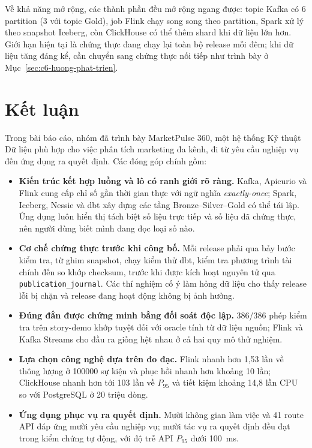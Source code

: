 Về khả năng mở rộng, các thành phần đều mở rộng ngang được: topic Kafka có 6 partition (3 với topic Gold), job Flink chạy song song theo partition, Spark xử lý theo snapshot Iceberg, còn ClickHouse có thể thêm shard khi dữ liệu lớn hơn. Giới hạn hiện tại là chứng thực đang chạy lại toàn bộ release mỗi đêm; khi dữ liệu tăng đáng kể, cần chuyển sang chứng thực nối tiếp như trình bày ở Mục~\ref{sec:c6-huong-phat-trien}.

\section{Kết luận}
\label{sec:c6-ket-luan}
Trong bài báo cáo, nhóm đã trình bày MarketPulse 360, một hệ thống Kỹ thuật Dữ liệu phù hợp cho việc phân tích marketing đa kênh, đi từ yêu cầu nghiệp vụ đến ứng dụng ra quyết định. Các đóng góp chính gồm:

\begin{itemize}
    \item \textbf{Kiến trúc kết hợp luồng và lô có ranh giới rõ ràng.} Kafka, Apicurio và Flink cung cấp chỉ số gần thời gian thực với ngữ nghĩa \emph{exactly-once}; Spark, Iceberg, Nessie và dbt xây dựng các tầng Bronze--Silver--Gold có thể tái lập. Ứng dụng luôn hiển thị tách biệt số liệu trực tiếp và số liệu đã chứng thực, nên người dùng biết mình đang đọc loại số nào.
    \item \textbf{Cơ chế chứng thực trước khi công bố.} Mỗi release phải qua bảy bước kiểm tra, từ ghim snapshot, chạy kiểm thử dbt, kiểm tra phương trình tài chính đến so khớp checksum, trước khi được kích hoạt nguyên tử qua \texttt{publication\_journal}. Các thí nghiệm cố ý làm hỏng dữ liệu cho thấy release lỗi bị chặn và release đang hoạt động không bị ảnh hưởng.
    \item \textbf{Đúng đắn được chứng minh bằng đối soát độc lập.} 386/386 phép kiểm tra trên story-demo khớp tuyệt đối với oracle tính từ dữ liệu nguồn; Flink và Kafka Streams cho đầu ra giống hệt nhau ở cả hai quy mô thử nghiệm.
    \item \textbf{Lựa chọn công nghệ dựa trên đo đạc.} Flink nhanh hơn 1,53 lần về thông lượng ở \num{100000} sự kiện và phục hồi nhanh hơn khoảng 10 lần; ClickHouse nhanh hơn tới 103 lần về $P_{95}$ và tiết kiệm khoảng 14,8 lần CPU so với PostgreSQL ở 20 triệu dòng.
    \item \textbf{Ứng dụng phục vụ ra quyết định.} Mười không gian làm việc và 41 route API đáp ứng mười yêu cầu nghiệp vụ; mười tác vụ ra quyết định đều đạt trong kiểm chứng tự động, với độ trễ API $P_{95}$ dưới 100~ms.
\end{itemize}

